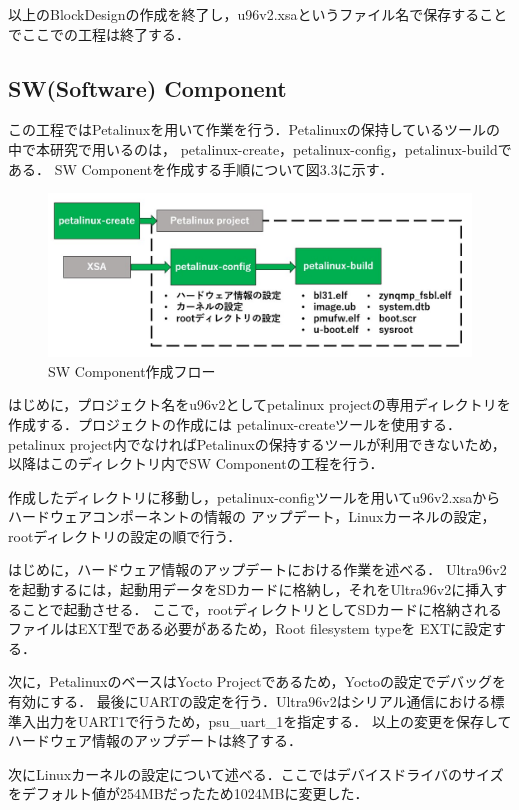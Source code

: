 \documentclass[11pt,a4j]{jreport}
\begin{document}
以上のBlockDesignの作成を終了し，u96v2.xsaというファイル名で保存することでここでの工程は終了する．

\subsection{SW(Software) Component}
この工程ではPetalinuxを用いて作業を行う．Petalinuxの保持しているツールの中で本研究で用いるのは，
petalinux-create，petalinux-config，petalinux-buildである．
SW Componentを作成する手順について図3.3に示す．
\begin{figure}[H]
  \center
  \includegraphics[scale = 0.8]{pict/pict9.jpg}
  \caption{SW Component作成フロー}
\end{figure}

はじめに，プロジェクト名をu96v2としてpetalinux projectの専用ディレクトリを作成する．プロジェクトの作成には
petalinux-createツールを使用する．petalinux project内でなければPetalinuxの保持するツールが利用できないため，
以降はこのディレクトリ内でSW Componentの工程を行う．

作成したディレクトリに移動し，petalinux-configツールを用いてu96v2.xsaからハードウェアコンポーネントの情報の
アップデート，Linuxカーネルの設定，rootディレクトリの設定の順で行う．

はじめに，ハードウェア情報のアップデートにおける作業を述べる．
Ultra96v2を起動するには，起動用データをSDカードに格納し，それをUltra96v2に挿入することで起動させる．
ここで，rootディレクトリとしてSDカードに格納されるファイルはEXT型である必要があるため，Root filesystem typeを
EXTに設定する．

次に，PetalinuxのベースはYocto Projectであるため，Yoctoの設定でデバッグを有効にする．
最後にUARTの設定を行う．Ultra96v2はシリアル通信における標準入出力をUART1で行うため，psu_uart_1を指定する．
以上の変更を保存してハードウェア情報のアップデートは終了する．

次にLinuxカーネルの設定について述べる．ここではデバイスドライバのサイズをデフォルト値が254MBだったため1024MBに変更した．
\end{document}
